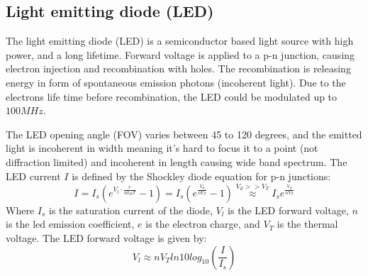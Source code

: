 \documentclass[\main/master.tex]{subfiles}
\begin{document}
\subsection{Light emitting diode (LED)}
The light emitting diode (LED) is a semiconductor based light source with high power, and a long lifetime. Forward voltage is applied to a p-n junction, causing electron injection and recombination with holes. The recombination is releasing energy in form of spontaneous emission photons (incoherent light). Due to the electrons life time before recombination, the LED could be modulated up to $100MHz$.
\par\noindent
The LED opening angle (FOV) varies between 45 to 120 degrees, and the emitted light is incoherent in width meaning it's hard to focus it to a point (not diffraction limited) and incoherent in length causing wide band spectrum. The LED current $I$ is defined by the Shockley diode equation for p-n junctions:
\begin{equation}
I  = I_s (e^{V_l\cdot \frac{e}{n k_B T} }-1) = I_s (e^{\frac{V_d}{n V_T} } -1) \overset{V_d>>V_T}{\approx} I_s e^{\frac{V_d}{n V_T} }   \label{eqn:led current}
\end{equation}
Where $I_s$ is the saturation current of the diode, $V_l$ is the LED forward voltage, $n$ is the led emission coefficient, $e$ is the electron charge, and $V_T$ is the thermal voltage. The LED forward voltage is given by:
\begin{equation}
V_l \approx n V_T ln10 log_{10} (\frac{I}{I_s}) \label{eqn:led voltage}
\end{equation}
\end{document}
